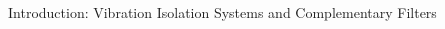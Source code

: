 \documentclass{beamer}
\begin{document}
\begin{frame}[t]
	\begin{columns}[t]
		
		\begin{column}{0.32\linewidth}
			
			\begin{block}{Introduction: Vibration Isolation Systems and Complementary Filters}
				\medskip
				

\end{block}
\end{column}
\end{columns}
\end{frame}
\end{document}
